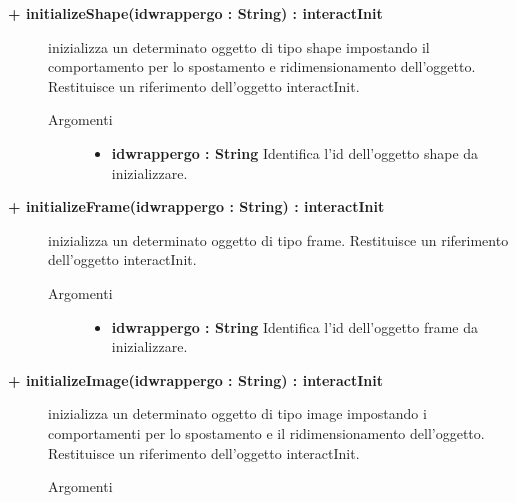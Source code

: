 \begin{description}
\begin{description}
		\item[\textbf{\color{blue}+ initializeShape(idwrappergo : String) : interactInit			}] \hfill
			inizializza un determinato oggetto di tipo shape impostando il comportamento per lo spostamento e ridimensionamento dell'oggetto. Restituisce un riferimento dell'oggetto interactInit.
			
		\begin{description}
			\item[Argomenti] \hfill
				\begin{itemize}
				
					\item \textbf{idwrappergo : String			} \hfill
						Identifica l'id dell'oggetto shape da inizializzare.
					
				\end{itemize}
		\end{description}
	\end{description}	

\begin{description}
		\item[\textbf{\color{blue}+ initializeFrame(idwrappergo : String) : interactInit			}] \hfill
			inizializza un determinato oggetto di tipo frame. Restituisce un riferimento dell'oggetto interactInit.
			
		\begin{description}
			\item[Argomenti] \hfill
				\begin{itemize}
				
					\item \textbf{idwrappergo : String			} \hfill
						Identifica l'id dell'oggetto frame da inizializzare.
					
				\end{itemize}
		\end{description}
	\end{description}
	
\begin{description}
		\item[\textbf{\color{blue}+ initializeImage(idwrappergo : String) : interactInit			}] \hfill
			inizializza un determinato oggetto di tipo image impostando i comportamenti per lo spostamento e il ridimensionamento dell'oggetto. Restituisce un riferimento dell'oggetto interactInit.
			
		\begin{description}
			\item[Argomenti] \hfill
				\begin{itemize}
				

\end{itemize}
\end{description}
\end{description}
\end{description}
